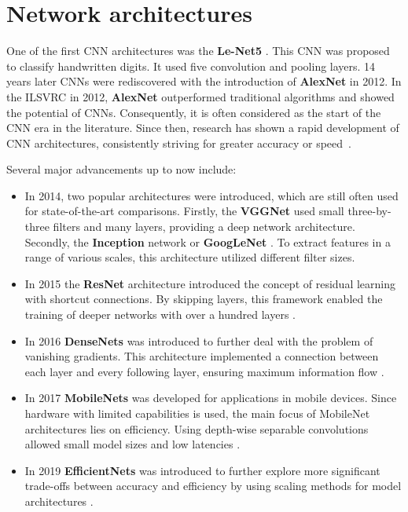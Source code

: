 \section{Network architectures}
\label{sec:networkArchitectures}

One of the first \ac{CNN} architectures was the \textbf{Le-Net5} \cite{LeNet5}.
This \ac{CNN} was proposed to classify handwritten digits.
It used five convolution and pooling layers.
14 years later \ac{CNN}s were rediscovered with the introduction of \textbf{AlexNet} \cite{AlexNet2012} in 2012.
In the \ac{ILSVRC} \cite{ILSVRC15} in 2012, \textbf{AlexNet} outperformed traditional algorithms and showed the potential of \ac{CNN}s.
Consequently, it is often considered as the start of the \ac{CNN} era in the literature.
Since then, research has shown a rapid development of \ac{CNN} architectures, consistently striving for greater accuracy or speed~\cite{networkArchitectureSurvey}.

\vspace{1cm} %

\noindent Several major advancements up to now include:

\begin{itemize}
    \item In 2014, two popular architectures were introduced, which are still often used for state-of-the-art comparisons. Firstly, the \textbf{\ac{VGGNet}} \cite{VGGNet2015} used small three-by-three filters and many layers, providing a deep network architecture. Secondly, the \textbf{Inception} network or \textbf{GoogLeNet} \cite{InceptionNet}. To extract features in a range of various scales, this architecture utilized different filter sizes.
    \item In 2015 the \textbf{ResNet} architecture \cite{ResNet} introduced the concept of residual learning with shortcut connections. By skipping layers, this framework enabled the training of deeper networks with over a hundred layers \cite{networkArchitectureSurvey}.
    \item In 2016 \textbf{DenseNets} \cite{DenseNets} was introduced to further deal with the problem of vanishing gradients. This architecture implemented a connection between each layer and every following layer, ensuring maximum information flow \cite{networkArchitectureSurvey}.
    \item In 2017 \textbf{MobileNets} \cite{MobileNetV1, MobileNetV2, MobileNetV3} was developed for applications in mobile devices. Since hardware with limited capabilities is used, the main focus of MobileNet architectures lies on efficiency. Using depth-wise separable convolutions allowed small model sizes and low latencies \cite{networkArchitectureSurvey}.
    \item In 2019 \textbf{EfficientNets} \cite{EfficientNet} was introduced to further explore more significant trade-offs between accuracy and efficiency by using scaling methods for model architectures \cite{networkArchitectureSurvey}. 
\end{itemize}

